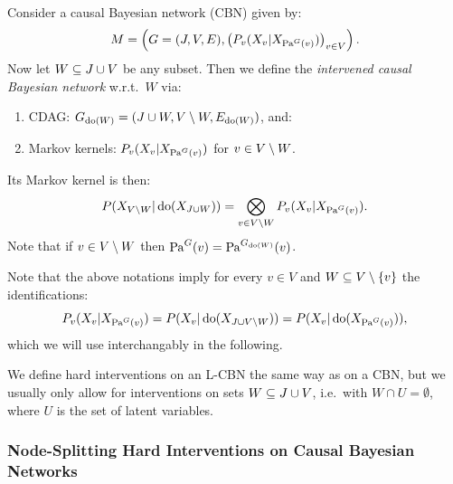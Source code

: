 \begin{Def}
    Consider a causal Bayesian network (CBN) given by: 
        \[ M= \left ( G=(J,V,E), \left ( P_v(X_v|X_{\mathrm{Pa}^G(v)}) \right )_{v \in V} \right ). \]
    Now let  $ W \subseteq J \cup V$ be any subset.
    Then we define the \emph{intervened causal Bayesian network} w.r.t.\ $W$ via:
    \begin{enumerate}
        \item CDAG: $G_{\operatorname{do}(W)} = (J \cup W, V \setminus W, E_{\operatorname{do}(W)}) $, and:
        \item Markov kernels: $P_v(X_v|X_{\mathrm{Pa}^G(v)})$ for $v \in V \setminus W$.
    \end{enumerate}
    Its \observational Markov kernel is then:
    \[ P(X_{V \setminus W}|\operatorname{do}(X_{J \cup W})) = \bigotimes_{v \in V\setminus W} P_v(X_v|X_{\mathrm{Pa}^G(v)}).  \]
    Note that if $ v\in V \setminus W$ then $\mathrm{Pa}^G(v) = \mathrm{Pa}^{G_{\operatorname{do}(W)}}(v)$.
\end{Def}

\begin{Rem}
    Note that the above notations imply for every $v \in V$ and $W \subseteq V \setminus \{ v \}$ the identifications:
    \[ P_v(X_v|X_{\mathrm{Pa}^G(v)}) =  P(X_v|\operatorname{do}(X_{J \cup V \setminus W})) = P(X_v|\operatorname{do}(X_{\mathrm{Pa}^G(v)})), \]
    which we will use interchangably in the following.
\end{Rem}


\begin{Rem}
We define hard interventions on an L-CBN the same way as on a CBN, but we usually 
only allow for interventions on sets $W \subseteq J \cup V$, i.e.\ with $W \cap U = \emptyset$, where $U$ is the set of latent variables.
\end{Rem}

\subsubsection{Node-Splitting Hard Interventions on Causal Bayesian Networks}

